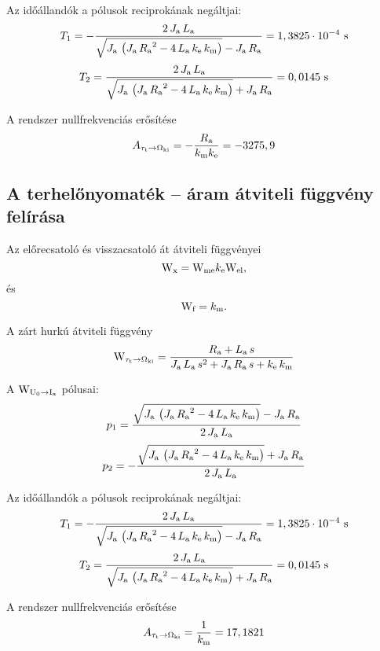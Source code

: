 Az időállandók a pólusok reciprokának negáltjai:
\begin{equation}
	T_1 = -\frac{2\, J_\text{a}\, L_\text{a}}{\sqrt{J_\text{a}\, \left(J_\text{a}\, {R_\text{a}}^2 - 4\, L_\text{a}\, k_\text{e}\, k_\text{m}\right)} - J_\text{a}\, R_\text{a}} = 1,3825\cdot10^{-4}\text{ s}
\end{equation}
\begin{equation}
	T_2 = \frac{2\, J_\text{a}\, L_\text{a}}{\sqrt{J_\text{a}\, \left(J_\text{a}\, {R_\text{a}}^2 - 4\, L_\text{a}\, k_\text{e}\, k_\text{m}\right)} + J_\text{a}\, R_\text{a}} = 0,0145\text{ s}
\end{equation}

A rendszer nullfrekvenciás erősítése
\begin{equation}
	A_{\tau_\text{t}\rightarrow\Omega_\text{ki}} =
	- \frac{R_\text{a}}{k_\text{m}k_\text{e}} = -3275,9
\end{equation}



\subsection{A terhelőnyomaték -- áram átviteli függvény felírása}
\label{subsect:Wt-i}

Az előrecsatoló és visszacsatoló át átviteli függvényei
\begin{equation}
	\mathrm{W}_\text{x} = \mathrm{W}_\text{me}k_\text{e}\mathrm{W}_\text{el},
\end{equation} és 
\begin{equation}
	\mathrm{W}_\text{f} = k_\text{m}.
\end{equation}

A zárt hurkú átviteli függvény
\begin{equation}
	\mathrm{W}_{\tau_\text{t}\rightarrow\Omega_\text{ki}} = 
	\frac{R_\text{a} + L_\text{a}\, s}{J_\text{a}\, L_\text{a}\, s^2 + J_\text{a}\, R_\text{a}\, s + k_\text{e}\, k_\text{m}}
\end{equation}

A $\mathrm{W}_{\mathrm{U}_0\rightarrow \mathrm{I}_\text{a}}$ pólusai:
\begin{equation}
	p_1 = \frac{\sqrt{J_\text{a}\, \left(J_\text{a}\, {R_\text{a}}^2 - 4\, L_\text{a}\, k_\text{e}\, k_\text{m}\right)} - J_\text{a}\, R_\text{a}}{2\, J_\text{a}\, L_\text{a}}
\end{equation}
\begin{equation}
	p_2 = -\frac{\sqrt{J_\text{a}\, \left(J_\text{a}\, {R_\text{a}}^2 - 4\, L_\text{a}\, k_\text{e}\, k_\text{m}\right)} + J_\text{a}\, R_\text{a}}{2\, J_\text{a}\, L_\text{a}}
\end{equation}

Az időállandók a pólusok reciprokának negáltjai:
\begin{equation}
	T_1 = -\frac{2\, J_\text{a}\, L_\text{a}}{\sqrt{J_\text{a}\, \left(J_\text{a}\, {R_\text{a}}^2 - 4\, L_\text{a}\, k_\text{e}\, k_\text{m}\right)} - J_\text{a}\, R_\text{a}} = 1,3825\cdot10^{-4}\text{ s}
\end{equation}
\begin{equation}
	T_2 = \frac{2\, J_\text{a}\, L_\text{a}}{\sqrt{J_\text{a}\, \left(J_\text{a}\, {R_\text{a}}^2 - 4\, L_\text{a}\, k_\text{e}\, k_\text{m}\right)} + J_\text{a}\, R_\text{a}} = 0,0145\text{ s}
\end{equation}

A rendszer nullfrekvenciás erősítése
\begin{equation}
	A_{\tau_\text{t}\rightarrow\Omega_\text{ki}} = \frac{1}{k_\text{m}} = 17,1821
\end{equation}


